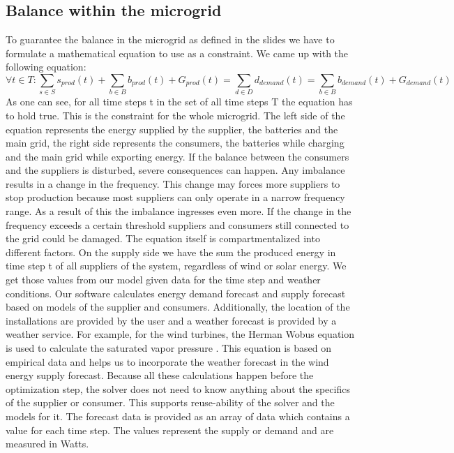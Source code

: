 \subsection{Balance within the microgrid}
To guarantee the balance in the microgrid as defined in the slides we have to formulate a mathematical equation to use as a constraint.
We came up with the following equation:\\
\begin{equation} \label{eq1}
\forall t \in T: \sum_{s \in S}{s_{prod}(t)} + \sum_{b \in B}{b_{prod}(t)} + G_{prod}(t) = \sum_{d \in D}{d_{demand}(t)} = \sum_{b \in B}{b_{demand}(t)} + G_{demand}(t)
\end{equation}
As one can see, for all time steps t in the set of all time steps T the equation has to hold true. 
This is the constraint for the whole microgrid. The left side of the equation represents the energy supplied by the supplier, the batteries and the main grid, the right side represents the consumers, the batteries while charging and the main grid while exporting energy. If the balance between the consumers and the suppliers is disturbed, severe consequences can happen. Any imbalance results in a change in the frequency. This change may forces more suppliers to stop production because most suppliers can only operate in a narrow frequency range. As a result of this the imbalance ingresses even more. If the change in the frequency exceeds a certain threshold suppliers and consumers still connected to the grid could be damaged. 
The equation itself is compartmentalized into different factors.
On the supply side we have the sum the produced energy in time step t of all suppliers of the system, regardless of wind or solar energy.
We get those values from our model given data for the time step and weather conditions. Our software calculates energy demand forecast and supply forecast based on models of the supplier and consumers. Additionally, the location of the installations are provided by the user and a weather forecast is provided by a weather service. For example, for the wind turbines, the Herman Wobus equation is used to calculate the saturated vapor pressure \cite{NOAA}. This equation is based on empirical data and helps us to incorporate the weather forecast in the wind energy supply forecast. Because all these calculations happen before the optimization step, the solver does not need to know anything about the specifics of the supplier or consumer. This supports reuse-ability of the solver and the models for it. The forecast data is provided as an array of data which contains a value for each time step. The values represent the supply or demand and are measured in Watts. 
